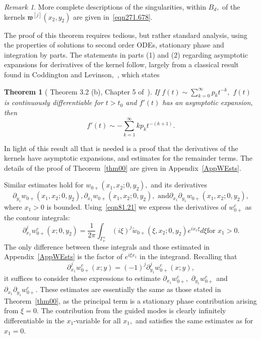 \documentclass[11pt]{article}
\newcommand{\Bk}{\color{black}}
\newcommand{\Rd}{\color{black}}
\newcommand\fw{\mathfrak w}
\newcommand\tw{\tilde w_{0+}}
\newcommand\pa{\partial}
\newtheorem*{theorem*}{Theorem}
\theoremstyle{definition}
\theoremstyle{remark}
\newtheorem{remark}{Remark}
\begin{document}
\begin{remark}
\Rd More complete descriptions of the singularities, within $B_d,$ of the
kernels $\fw^{[j]}(x_2,y_2)$ are given in~\eqref{eqn271.678}. \Bk
\end{remark}
The proof of this theorem requires tedious, but rather standard analysis, using
the properties of solutions to second order ODEs, stationary phase and
integration by parts. \Rd The statements in parts (1) and (2) regarding 
asymptotic expansions for derivatives of the kernel follow, largely from a
classical result found in Coddington and Levinson,~\cite{CoddingtonLevinson}, which
states
     \begin{theorem*}[ Theorem 3.2 (b), Chapter 5 of~\cite{CoddingtonLevinson}]
       If $f(t)\sim \sum_{k=0}^{\infty}p_kt^{-k},$ $f(t)$ is continuously
       differentiable for $t>t_0$ and $f'(t)$ has an asymptotic expansion, then
       \begin{equation}
         f'(t)\sim -\sum_{k=1}^{\infty}kp_kt^{-(k+1)}.
       \end{equation}
     \end{theorem*}

     \noindent
In light of this result all that is needed is a proof that the derivatives of the kernels have
asymptotic expansions, and estimates for the remainder terms. \Bk The details of the
proof of Theorem~\ref{thm00} are given in Appendix~\ref{AppWEsts}.


Similar estimates hold for
$w_{0+}(x_1,x_2;0,y_2),$ and its derivatives
$$\pa_{y_1}w_{0+}(x_1,x_2;0,y_2), \pa_{x_1}w_{0+}(x_1,x_2;0,y_2),\text{ and
}\pa_{x_1}\pa_{y_1}w_{0+}(x_1,x_2;0,y_2),$$ where $x_1>0$ is bounded. Using~\eqref{eqn81.21}
   we express the derivatives of $w_{0+}^c$ as the contour integrals:
   \begin{equation}\label{eqn81.210} 
     \pa_{x_1}^jw^c_{0+}(x;0,y_2)=
     \frac{1}{2\pi}\int_{\Gamma_{\nu}^{+}}(i\xi)^j\tw(\xi,x_2;0,y_2)e^{ix_1\xi}d\xi\text{
    for }x_1>0.
   \end{equation}
  The only difference between these integrals and those estimated in
   Appendix~\ref{AppWEsts} is the factor of $e^{i\xi x_1}$ in the integrand. Recalling
   that
   $$\pa_{x_1}^jw^c_{0+}(x;y)=(-1)^j\pa_{y_1}^jw^c_{0+}(x;y),$$
   it suffices to
  consider these expressions to estimate $\pa_{x_1}w^c_{0+},$
  $\pa_{y_1}w^c_{0+}$ and $\pa_{x_1}\pa_{y_1}w^c_{0+}.$ These estimates are
  essentially the same as those stated in Theorem~\ref{thm00}, as the principal
  term is a stationary phase contribution arising from $\xi=0.$ The contribution
  from the guided modes is clearly infinitely differentiable in the
  $x_1$-variable for all $x_1,$ and satisfies the same estimates as for $x_1=0.$
\end{document}
